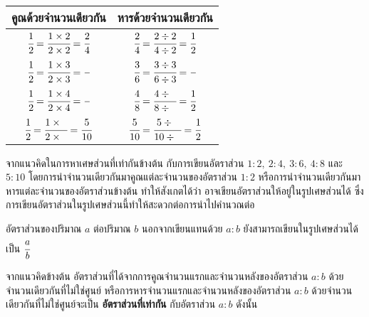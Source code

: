 \documentclass[
  a4paper,
  DIV=11,
  numbers=noendperiod]{scrartcl}
\begin{document}
\begin{tabular}{c|c}

\hline
\textbf{คูณด้วยจำนวนเดียวกัน}  & \textbf{หารด้วยจำนวนเดียวกัน} \\

\hline
$\cfrac{1}{2}=\cfrac{1\times 2}{2\times 2}=\cfrac{2}{4}$ & 
$\cfrac{2}{4}=\cfrac{2\div 2}{4\div 2}=\cfrac{1}{2}$ \\

\hline
$\cfrac{1}{2}=\cfrac{1\times 3}{2\times 3}=\cfrac{\phantom{3}}{\phantom{6}}$ & 
$\cfrac{3}{6}=\cfrac{3\div 3}{6\div 3}=\cfrac{\phantom{1}}{\phantom{2}}$ \\

\hline
$\cfrac{1}{2}=\cfrac{1\times 4}{2\times 4}=\cfrac{\phantom{4}}{\phantom{8}}$ & 
$\cfrac{4}{8}=\cfrac{4\div \phantom{4}}{8\div \phantom{4}}=\cfrac{1}{2}$ \\

\hline
$\cfrac{1}{2}=\cfrac{1\times \phantom{5}}{2\times \phantom{5}}=\cfrac{5}{10}$ & 
$\cfrac{5}{10}=\cfrac{5\div \phantom{5}}{10\div \phantom{5}}=\cfrac{1}{2}$ \\

\hline

\end{tabular}

\flushleft

จากแนวคิดในการหาเศษส่วนที่เท่ากันข้างต้น กับการเขียนอัตราส่วน
\(1:2,\ 2:4,\ 3:6,\ 4:8\) และ \(5:10\)
โดยการนำจำนวนเดียวกันมาคูณแต่ละจำนวนของอัตราส่วน \(1:2\)
หรือการนำจำนวนเดียวกันมาหารแต่ละจำนวนของอัตราส่วนข้างต้น ทำให้สังเกตได้ว่า
อาจเขียนอัตราส่วนให้อยู่ในรูปเศษส่วนได้
ซึ่งการเขียนอัตราส่วนในรูปเศษส่วนนี้ทำให้สะดวกต่อการนำไปคำนวณต่อ

\centering
\begin{tcolorbox}[colback=white!5!white,
colframe=red!70!black,width=13cm]

อัตราส่วนของปริมาณ $a$ ต่อปริมาณ $b$ นอกจากเขียนแทนด้วย $a:b$ ยังสามารถเขียนในรูปเศษส่วนได้เป็น $\cfrac{a}{b}$

\end{tcolorbox}

\flushleft

จากแนวคิดข้างต้น อัตราส่วนที่ได้จากการคูณจำนวนแรกและจำนวนหลังของอัตราส่วน \(a:b\)
ด้วยจำนวนเดียวกันที่ไม่ใช่ศูนย์ หรือการหารจำนวนแรกและจำนวนหลังของอัตราส่วน \(a:b\)
ด้วยจำนวนเดียวกันที่ไม่ใช่ศูนย์จะเป็น \textbf{\textcolor{NavyBlue}{อัตราส่วนที่เท่ากัน}}
กับอัตราส่วน \(a:b\) ดังนั้น

\centering
\end{document}
